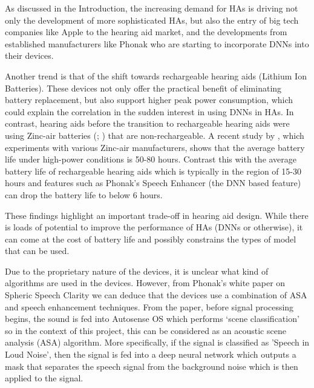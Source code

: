 \documentclass[logo,bsc,singlespacing,parskip,online]{infthesis}
\begin{document}

As discussed in the Introduction, the increasing demand for HAs is driving not only 
the development of more sophisticated HAs, but also the entry of big tech 
companies like Apple to the hearing aid market, and the developments from established 
manufacturers like Phonak who are starting to incorporate DNNs into their devices.

Another trend is that of the shift towards rechargeable hearing aids (Lithium Ion Batteries).
These devices not only offer the practical benefit of eliminating battery replacement, but also support higher peak power consumption, which could explain the correlation in the sudden interest in using DNNs in HAs.
In contrast, hearing aids before the transition to rechargeable hearing aids were using Zinc-air batteries 
(\cite{sparkes_study_1997}; \cite{mir_evaluation_2023})
that are non-rechargeable.
A recent study by \citet{thomas_zincair_2024}, which 
experiments with various Zinc-air manufacturers, shows that the average battery life 
under high-power conditions is 50-80 hours. Contrast this with the average battery life of 
rechargeable hearing aids which is typically in the region of 15-30 hours and 
features such as Phonak's Speech Enhancer (the DNN based feature) can drop the battery life 
to below 6 hours. 

These findings highlight an important trade-off in hearing aid design. While there is loads of potential to improve the performance of HAs (DNNs or otherwise),
it can come at the cost of battery life and possibly constrains 
the types of model that can be used. 

Due to the proprietary nature of the devices, it is unclear what kind of 
algorithms are used in the devices. However, from Phonak's white paper on Spheric Speech Clarity \cite{Hasemann2024PhonakSphere}
we can deduce that the devices use a combination of ASA and speech enhancement techniques.
From the paper, before signal processing begins, the sound is fed into Autosense OS which 
performs `scene classification' so in the context of this project, this can be 
considered as an acoustic scene analysis (ASA) algorithm. More specifically, if 
the signal is classified as 'Speech in Loud Noise', then the signal is fed into a 
deep neural network which outputs a mask that separates the speech signal from the background noise 
which is then applied to the signal. 
\end{document}
